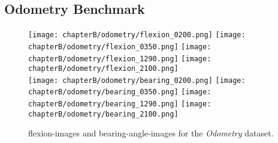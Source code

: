 \subsection{Odometry Benchmark}\label{sec:odometry_images}
\begin{figure}[H]
    \texttt{[image: chapterB/odometry/flexion\_0200.png]}%
    \texttt{[image: chapterB/odometry/flexion\_0350.png]}%
    \texttt{[image: chapterB/odometry/flexion\_1290.png]}%
    \texttt{[image: chapterB/odometry/flexion\_2100.png]}\\
    \texttt{[image: chapterB/odometry/bearing\_0200.png]}%
    \texttt{[image: chapterB/odometry/bearing\_0350.png]}%
    \texttt{[image: chapterB/odometry/bearing\_1290.png]}%
    \texttt{[image: chapterB/odometry/bearing\_2100.png]}\\
    \caption{\glspl{flexion-image} and \glspl{bearing-angle-image} for the \emph{Odometry} dataset.}
\end{figure}
